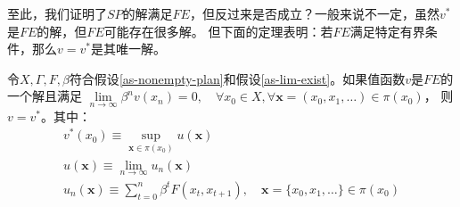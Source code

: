 至此，我们证明了$SP$的解满足$FE$，但反过来是否成立？一般来说不一定，虽然$v^*$是$FE$的解，但$FE$可能存在很多解。
但下面的定理表明：若$FE$满足特定有界条件，那么$v=v^*$是其唯一解。

\begin{theorem} \label{th-solution-fe-sp}
    令$X, \Gamma, F, \beta$符合假设\ref{as-nonempty-plan}和假设\ref{as-lim-exist}。如果值函数$v$是$FE$的一个解且满足
    $\lim\limits_{n\rightarrow \infty}\beta^n v\left(x_n\right)=0, 
    \quad \forall x_0\in X, \forall \boldsymbol{x}=\left(x_0,x_1,\dots\right)\in \pi\left(x_0\right)$，
    则$v=v^*$。其中：
    \begin{gather*}
        v^*\left(x_0\right) \equiv \sup _{\boldsymbol{x}\in\pi\left(x_0\right)} u\left(\boldsymbol{x}\right) \\
        u\left(\boldsymbol{x}\right) \equiv \lim _{n\rightarrow\infty}u_n\left(\boldsymbol{x}\right) \\
        u_n(\boldsymbol{x}) \equiv \sum_{t=0}^n \beta^t F\left(x_t, x_{t+1}\right), \quad \boldsymbol{x}=\{x_0,x_1,\dots\} \in \pi\left(x_0\right)
    \end{gather*}
\end{theorem}
